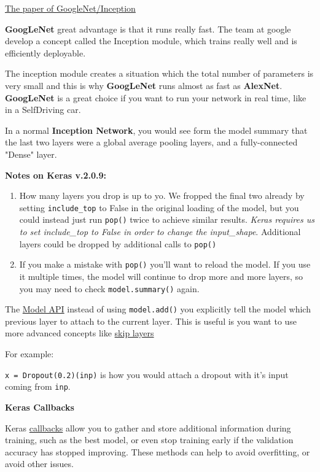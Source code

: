 \documentclass[11pt, a4paper]{article}
\begin{document}
\href{https://arxiv.org/pdf/1409.4842.pdf}{The paper of GoogleNet/Inception}


\textbf{GoogLeNet} great advantage is that it runs really fast. The team at google develop a concept called the Inception module, which trains really well and is efficiently deployable. 

The inception module creates a situation which the total number of parameters is very small and this is why \textbf{GoogLeNet} runs almost as fast as \textbf{AlexNet}. 
\textbf{GoogLeNet} is a great choice if you want to run your network in real time, like in a SelfDriving car.

In a normal \textbf{Inception Network}, you would see form the model summary that the last two layers were a global average pooling layers, and a fully-connected "Dense" layer. 

\textbf{Notes on Keras v.2.0.9:} 

\begin{enumerate}
	\item How many layers you drop is up to yo. We fropped the final two already by setting \texttt{include\_top} to False in the original loading of the model, but you could instead just run \texttt{pop()} twice to achieve similar results. \textit{Keras requires us to set include\_top to False in order to change the input\_shape}. Additional layers could be dropped by additional calls to \texttt{pop()}  
	\item If you make a mistake with \texttt{pop()} you'll want to reload the model. If you use it multiple times, the model will continue to drop more and more layers, so you may need to check \texttt{model.summary()} again. 
\end{enumerate}

The \href{https://keras.io/models/model/}{Model API} instead of using \texttt{model.add()} you explicitly tell the model which previous layer to attach to the current layer. This is useful is you want to use more advanced concepts like \href{https://en.wikipedia.org/wiki/Residual_neural_network}{skip layers} 


For example:

\texttt{x = Dropout(0.2)(inp)} is how you would attach a dropout with it's input coming from \texttt{inp}.


\textbf{Keras Callbacks}

Keras \href{https://keras.io/callbacks/}{callbacks}  allow you to gather and store additional information during training, such as the best model, or even stop training early if the validation accuracy has stopped improving. These methods can help to avoid overfitting, or avoid other issues.
\end{document}
